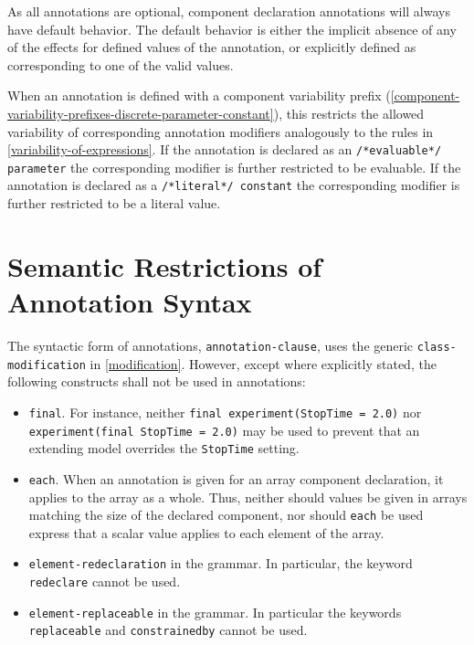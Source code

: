 As all annotations are optional, component declaration annotations will always have default behavior.
The default behavior is either the implicit absence of any of the effects for defined values of the annotation, or explicitly defined as corresponding to one of the valid values.

When an annotation is defined with a component variability prefix (\cref{component-variability-prefixes-discrete-parameter-constant}), this restricts the allowed variability of corresponding annotation modifiers analogously to the rules in \cref{variability-of-expressions}.
If the annotation is declared as an \lstinline!/*evaluable*/ parameter! the corresponding modifier is further restricted to be evaluable.
If the annotation is declared as a \lstinline!/*literal*/ constant! the corresponding modifier is further restricted to be a literal value.


\section{Semantic Restrictions of Annotation Syntax}\label{semantic-restrictions-of-annotation-syntax}

The syntactic form of annotations, \lstinline[language=grammar]!annotation-clause!, uses the generic \lstinline[language=grammar]!class-modification! in \cref{modification}.
However, except where explicitly stated, the following constructs shall not be used in annotations:
\begin{itemize}
\item
\lstinline!final!.
For instance, neither \lstinline!final experiment(StopTime = 2.0)! nor \lstinline!experiment(final StopTime = 2.0)! may be used to prevent that an extending model overrides the \lstinline!StopTime! setting.
\item
\lstinline!each!.
When an annotation is given for an array component declaration, it applies to the array as a whole.
Thus, neither should values be given in arrays matching the size of the declared component, nor should \lstinline!each! be used express that a scalar value applies to each element of the array.
\item
\lstinline[language=grammar]!element-redeclaration! in the grammar.
In particular, the keyword \lstinline!redeclare! cannot be used.
\item
\lstinline[language=grammar]!element-replaceable! in the grammar.
In particular the keywords \lstinline!replaceable! and \lstinline!constrainedby! cannot be used.
\end{itemize}


